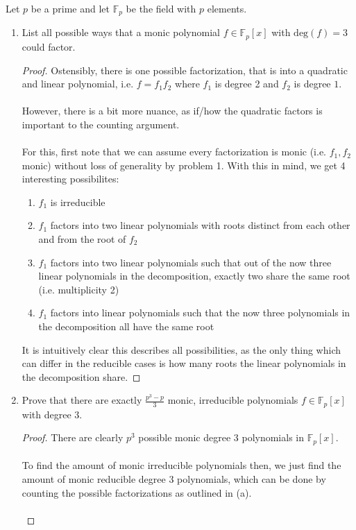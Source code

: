 \documentclass[12pt]{article}
\newenvironment{ex}[2][Exercise]{\begin{trivlist}
\item[\hskip \labelsep {\bfseries #1}\hskip \labelsep {\bfseries #2.}]}{\end{trivlist}}
\begin{document}
\begin{ex}{2}
    Let $p$ be a prime and let $\mathbb{F}_p$ be the field with $p$ elements.
    \begin{enumerate}[label=(\alph*)]
        \item List all possible ways that a monic polynomial $f \in \mathbb{F}_p[x]$ with $\text{deg}(f) = 3$ could factor.
        \begin{proof}
            Ostensibly, there is one possible factorization, that is into a quadratic and linear polynomial, i.e. $f = f_1f_2$ where $f_1$ is degree 2 and $f_2$ is degree $1$. \\ \\
            However, there is a bit more nuance, as if/how the quadratic factors is important to the counting argument. \\ \\
            For this, first note that we can assume every factorization is monic (i.e. $f_1, f_2$ monic) without loss of generality by problem 1. With this in mind, we get 4 interesting possibilites:
            \begin{enumerate}[label=(\roman*)]
                \item $f_1$ is irreducible \\
                \item $f_1$ factors into two linear polynomials with roots distinct from each other and from the root of $f_2$
                \item $f_1$ factors into two linear polynomials such that out of the now three linear polynomials in the decomposition, exactly two share the same root (i.e. multiplicity 2)
                \item $f_1$ factors into linear polynomials such that the now three polynomials in the decomposition all have the same root
            \end{enumerate}
            It is intuitively clear this describes all possibilities, as the only thing which can differ in the reducible cases is how many roots the linear polynomials in the decomposition share. 
        \end{proof}
        \item Prove that there are exactly $\frac{p^3 - p}{3}$ monic, irreducible polynomials $f \in \mathbb{F}_p[x]$ with degree $3$.
        \begin{proof}
            There are clearly $p^3$ possible monic degree 3 polynomials in $\mathbb{F}_p[x]$. \\ \\To find the amount of monic irreducible polynomials then, we just find the amount of monic reducible degree 3 polynomials, which can be done by counting the possible factorizations as outlined in (a). \\ \\

\end{proof}
\end{enumerate}
\end{ex}
\end{document}
